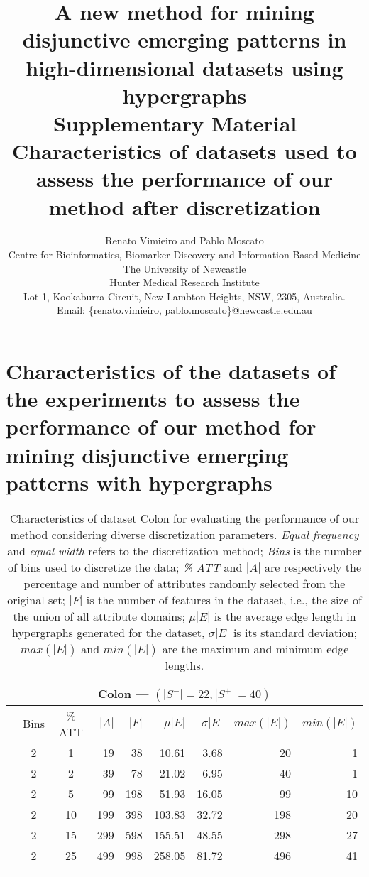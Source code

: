 \documentclass[12pt,a4paper]{article}
\title{A new method for mining disjunctive emerging patterns in high-dimensional datasets using hypergraphs\\[0.5cm]
\large Supplementary Material -- Characteristics of datasets used to assess the performance of our method after discretization}
\author{\small Renato Vimieiro and Pablo Moscato\\
\small Centre for Bioinformatics, Biomarker Discovery and Information-Based Medicine\\
\small The University of Newcastle\\
\small Hunter Medical Research Institute\\
\small Lot 1, Kookaburra Circuit, New Lambton Heights, NSW, 2305, Australia.\\ 
\small Email: \{renato.vimieiro, pablo.moscato\}@newcastle.edu.au
}
\date{}
\begin{document}
\maketitle

\appendix
\section*{Characteristics of the datasets of the experiments to assess the performance of our method for mining
disjunctive emerging patterns with hypergraphs}
\label{apsec:datasets}
\captionsetup{font=small}

\begin{table}
\caption
{Characteristics of dataset Colon for evaluating the performance of our method considering diverse discretization parameters.
\emph{Equal frequency} and \emph{equal width} refers to the discretization method;
\emph{Bins} is the number of bins used to discretize the data; \emph{\% ATT} and $|A|$ are respectively the percentage
and number of attributes randomly selected from the original set; $|F|$ is the number of features in the dataset, i.e., the
size of the union of all attribute domains; $\mu{|E|}$ is the average edge length in hypergraphs generated for the dataset,
$\sigma{|E|}$ is its standard deviation; $max(|E|)$ and $min(|E|)$ are the maximum and minimum edge lengths.}
\label{exp:colon}
\begin{center}\small
\begin{tabular}{cccrrrrrr}
\hline
\multicolumn{9}{c}{\parbox{10cm}{\vspace{0.1cm}\centering \textbf{\large Colon} --- $(|S^{-}|=22, |S^{+}|=40)$\vspace{0.1cm}}} \\\hline
\parbox{0.1cm}{\vspace{0.5cm}}& Bins & \% ATT & $|A|$ & $|F|$ & $\mu{|E|}$ & $\sigma{|E|}$ & $max(|E|)$ & $min(|E|)$ \\\hline
&  2 & 1 &  19 &  38  & 10.61 & 3.68 &  20 &   1 \\ 
&  2 & 2 &  39 &  78  & 21.02 & 6.95 &  40 &   1 \\ 
&  2 & 5 &  99 & 198 & 51.93 & 16.05 &  99 &  10 \\ 
& 2 & 10  & 199 & 398  & 103.83 & 32.72 & 198 &  20 \\
&  2 & 15 & 299 & 598  & 155.51 & 48.55 & 298 &  27 \\ 
&  2 & 25 & 499 & 998  & 258.05 & 81.72 & 496 &  41 \\ 

\end{tabular}
\end{center}
\end{table}
\end{document}
